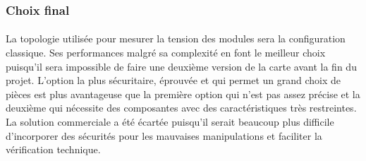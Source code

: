 	\subsubsection*{Choix final}
	\paragraph*{}
	La topologie utilisée pour mesurer la tension des modules sera la configuration classique. Ses performances malgré sa complexité en font le meilleur choix puisqu'il sera impossible de faire une deuxième version de la carte avant la fin du projet. L'option la plus sécuritaire, éprouvée et qui permet un grand choix de pièces est plus avantageuse que la première option qui n'est pas assez précise et la deuxième qui nécessite des composantes avec des caractéristiques très restreintes. La solution commerciale a été écartée puisqu'il serait beaucoup plus difficile d'incorporer des sécurités pour les mauvaises manipulations et faciliter la vérification technique.